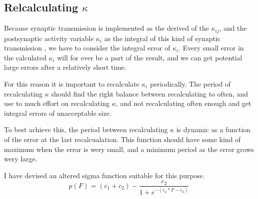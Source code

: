 

		\subsection{Relcalculating $\kappa$}
		\label{ssecRecalcKappa}
		Because synaptic transmission is implemented as the derived of the $\kappa_{ij}$, and the postsynaptic activity variable $\kappa_i$ as the integral of this kind of synaptic transmission
		, we have to consider the integral error of $\kappa_i$. 
		Every small error in the calculated $\kappa_i$ will for ever be a part of the result, and we can get potential large errors after a relatively short time.

		For this reason it is important to recalculate $\kappa_i$ periodically.
		The period of recalculating $\kappa$ should find the right balance between recalculating to often, and use to much effort on recalculating $\kappa$, and not recalculating often enough and get integral errors of unacceptable size.

		To best achieve this, the period between recalculating $\kappa$ is dynamic as a function of the error at the last recalcualation. 
		This function should have some kind of maximum when the error is wery small, and a minimum period as the error grows wery large. 

		I have devised an altered sigma function suitable for this purpose.
		\begin{equation}
			\label{eqSigmaFunk}
			p(F) = (c_1+c_2) - \frac{c_2}{1+e^{-(c_4*F-c_3)}}
		\end{equation}


